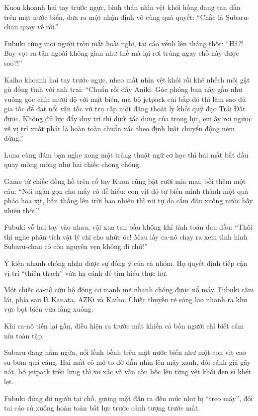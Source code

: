 \documentclass[../main.tex]{subfiles}
\begin{document}
Kuon khoanh hai tay trước ngực, bình thản nhìn vệt khói hồng đang tan dần trên mặt nước biển, đưa ra một nhận định vô cùng quả quyết: ``Chắc là Subaru-chan quay về rồi.''

Fubuki cùng mọi người tròn mắt hoài nghi, tai cáo vểnh lên thảng thốt: ``Hả?! Bay vọt ra tận ngoài không gian như thế mà lại rơi trúng ngay chỗ này được sao?!''

Kaiho khoanh hai tay trước ngực, nheo mắt nhìn vệt khói rồi khẽ nhếch môi gật gù đồng tình với anh trai: ``Chuẩn rồi đấy Aniki. Góc phóng ban nãy gần như vuông góc chín mươi độ với mặt biển, mà bộ jetpack cùi bắp đó thì làm sao đủ gia tốc để đạt nổi vận tốc vũ trụ cấp một đặng thoát ly khỏi quỹ đạo Trái Đất được. Không đủ lực đẩy duy trì thì dưới tác dụng của trọng lực, em ấy rơi ngược về vị trí xuất phát là hoàn toàn chuẩn xác theo định luật chuyển động ném đứng.''

Luna cùng đám bạn nghe xong một tràng thuật ngữ cơ học thì hai mắt bắt đầu quay mòng mòng như hai chiếc chong chóng.

Game từ chiếc đồng hồ trên cổ tay Kuon cũng bật cười mỉa mai, bồi thêm một câu: ``Nói ngắn gọn cho mấy cô dễ hiểu: con vịt đó tự biến mình thành một quả pháo hoa xịt, bắn thẳng lên trời bao nhiêu thì rơi tự do cắm đầu xuống nước bấy nhiêu thôi.''

Fubuki vỗ hai tay vào nhau, vội xua tan bầu không khí tính toán đau đầu: ``Thôi thì nghe phân tích vật lý chi cho nhức óc! Mau lấy ca-nô chạy ra xem tình hình Subaru-chan có còn nguyên vẹn không đi chứ!''

Ý kiến nhanh chóng nhận được sự đồng ý của cả nhóm. Họ quyết định tiếp cận vị trí ``thiên thạch'' vừa hạ cánh để tìm hiểu thực hư.

\ct

Một chiếc ca-nô cứu hộ động cơ mạnh mẽ nhanh chóng được nổ máy. Fubuki cầm lái, phía sau là Kanata, AZKi và Kaiho. Chiếc thuyền rẽ sóng lao nhanh ra khu vực bọt biển vừa lắng xuống.


Khi ca-nô tiến lại gần, điều hiện ra trước mắt khiến cả bốn người chỉ biết câm nín toàn tập.

Subaru đang nằm ngửa, nổi lềnh bềnh trên mặt nước biển như một con vịt cao su bơm quá căng. Hai mắt cô mở to đờ đẫn nhìn lên mây xanh, đôi cánh giả gãy nát, bộ jetpack trên lưng thì xơ xác và vẫn còn bốc lên từng vệt khói đen sì khét lẹt.

Fubuki đứng đơ người tại chỗ, gương mặt đẫn ra đến mức như bị ``treo máy'', đôi tai cáo rủ xuống hoàn toàn bất lực trước cảnh tượng trước mắt.
\end{document}
